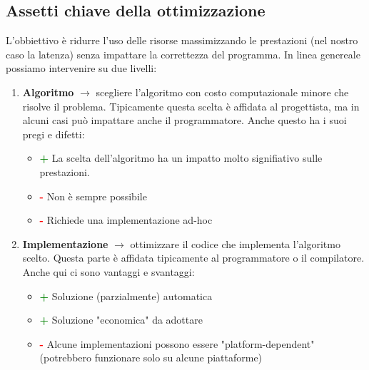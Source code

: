 \subsection{Assetti chiave della ottimizzazione}
L'obbiettivo è ridurre l'uso delle risorse massimizzando le prestazioni
(nel nostro caso la latenza) senza impattare la correttezza del programma. In linea genereale
possiamo intervenire su due livelli:
\begin{enumerate}
    \item \textbf{Algoritmo} $\rightarrow$ scegliere l'algoritmo con costo computazionale
    minore che risolve il problema. Tipicamente questa scelta è affidata al progettista,
    ma in alcuni casi può impattare anche il programmatore. Anche questo ha i suoi pregi e difetti:
    \begin{itemize}
        \item \textbf{\textcolor{green}{+}} La scelta dell'algoritmo ha un  impatto molto signifiativo sulle prestazioni.
        \item \textbf{\textcolor{red}{-}}  Non è sempre possibile
        \item \textbf{\textcolor{red}{-}} Richiede una implementazione ad-hoc
    \end{itemize}
    \item \textbf{Implementazione} $\rightarrow$ ottimizzare il codice che implementa
    l'algoritmo scelto. Questa parte è affidata tipicamente al programmatore o il compilatore.
    Anche qui ci sono vantaggi e svantaggi:
    \begin{itemize}
        \item \textbf{\textcolor{green}{+}} Soluzione (parzialmente) automatica
        \item \textbf{\textcolor{green}{+}}  Soluzione "economica" da adottare
        \item \textbf{\textcolor{red}{-}} Alcune  implementazioni possono essere "platform-dependent"
        (potrebbero funzionare solo su alcune piattaforme)
    \end{itemize}
\end{enumerate}
